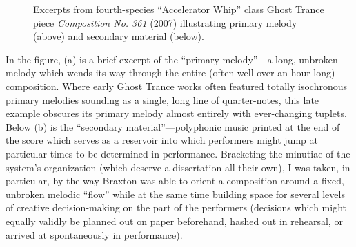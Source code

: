         \begin{figure}
            \centering
            
            \vspace{5pt}
            
            \captionsetup{width=.5\textwidth}
            \caption[Excerpts from fourth-species ``Accelerator Whip'' class Ghost Trance piece \textit{Composition No. 361} (2007) illustrating primary melody (above) and secondary material (below).]{Excerpts from fourth-species ``Accelerator Whip'' class Ghost Trance piece \textit{Composition No. 361} (2007) illustrating primary melody (above) and secondary material (below).\footnotemark}%
            \label{fig:ghosttranceex}%
        \end{figure}

    In the figure, (a) is a brief excerpt of the ``primary melody''---a long, unbroken melody which wends its way through the entire (often well over an hour long) composition. Where early Ghost Trance works often featured totally isochronous primary melodies sounding as a single, long line of quarter-notes, this late example obscures its primary melody almost entirely with ever-changing tuplets. Below (b) is the ``secondary material''---polyphonic music printed at the end of the score which serves as a reservoir into which performers might jump at particular times to be determined in-performance. Bracketing the minutiae of the system's organization (which deserve a dissertation all their own), I was taken, in particular, by the way Braxton was able to orient a composition around a fixed, unbroken melodic ``flow'' while at the same time building space for several levels of creative decision-making on the part of the performers (decisions which might equally validly be planned out on paper beforehand, hashed out in rehearsal, or arrived at spontaneously in performance).

